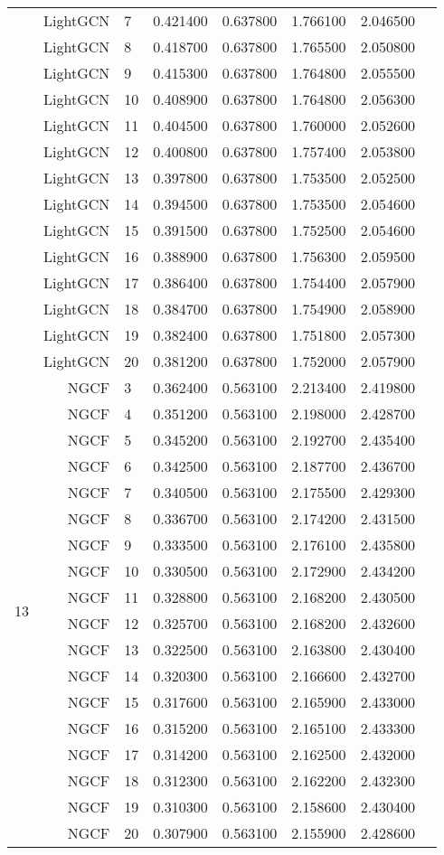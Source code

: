\documentclass[a4paper,12pt]{article}
\begin{document}
\begin{center}
\begin{longtable}{lrlrrrrr}
& LightGCN & 7 & 0.421400 & 0.637800 & 1.766100 & 2.046500 \\
& LightGCN & 8 & 0.418700 & 0.637800 & 1.765500 & 2.050800 \\
& LightGCN & 9 & 0.415300 & 0.637800 & 1.764800 & 2.055500 \\
& LightGCN & 10 & 0.408900 & 0.637800 & 1.764800 & 2.056300 \\
& LightGCN & 11 & 0.404500 & 0.637800 & 1.760000 & 2.052600 \\
& LightGCN & 12 & 0.400800 & 0.637800 & 1.757400 & 2.053800 \\
& LightGCN & 13 & 0.397800 & 0.637800 & 1.753500 & 2.052500 \\
& LightGCN & 14 & 0.394500 & 0.637800 & 1.753500 & 2.054600 \\
& LightGCN & 15 & 0.391500 & 0.637800 & 1.752500 & 2.054600 \\
& LightGCN & 16 & 0.388900 & 0.637800 & 1.756300 & 2.059500 \\
& LightGCN & 17 & 0.386400 & 0.637800 & 1.754400 & 2.057900 \\
& LightGCN & 18 & 0.384700 & 0.637800 & 1.754900 & 2.058900 \\
& LightGCN & 19 & 0.382400 & 0.637800 & 1.751800 & 2.057300 \\
& LightGCN & 20 & 0.381200 & 0.637800 & 1.752000 & 2.057900 \\ \hline
\multirow{18}{1cm}{13} & NGCF & 3 & 0.362400 & 0.563100 & 2.213400 & 2.419800 \\
& NGCF & 4 & 0.351200 & 0.563100 & 2.198000 & 2.428700 \\
& NGCF & 5 & 0.345200 & 0.563100 & 2.192700 & 2.435400 \\
& NGCF & 6 & 0.342500 & 0.563100 & 2.187700 & 2.436700 \\
& NGCF & 7 & 0.340500 & 0.563100 & 2.175500 & 2.429300 \\
& NGCF & 8 & 0.336700 & 0.563100 & 2.174200 & 2.431500 \\
& NGCF & 9 & 0.333500 & 0.563100 & 2.176100 & 2.435800 \\
& NGCF & 10 & 0.330500 & 0.563100 & 2.172900 & 2.434200 \\
& NGCF & 11 & 0.328800 & 0.563100 & 2.168200 & 2.430500 \\
& NGCF & 12 & 0.325700 & 0.563100 & 2.168200 & 2.432600 \\
& NGCF & 13 & 0.322500 & 0.563100 & 2.163800 & 2.430400 \\
& NGCF & 14 & 0.320300 & 0.563100 & 2.166600 & 2.432700 \\
& NGCF & 15 & 0.317600 & 0.563100 & 2.165900 & 2.433000 \\
& NGCF & 16 & 0.315200 & 0.563100 & 2.165100 & 2.433300 \\
& NGCF & 17 & 0.314200 & 0.563100 & 2.162500 & 2.432000 \\
& NGCF & 18 & 0.312300 & 0.563100 & 2.162200 & 2.432300 \\
& NGCF & 19 & 0.310300 & 0.563100 & 2.158600 & 2.430400 \\
& NGCF & 20 & 0.307900 & 0.563100 & 2.155900 & 2.428600 \\


\end{longtable}
\end{center}
\end{document}
